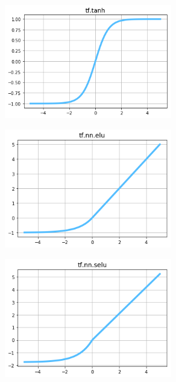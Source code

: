 \begin{figure}
\centering
\includegraphics[width=0.65\textwidth]{./sync_imgs/act/smooth/tangent.png}
\label{fig:act_smooth_tangent}
\end{figure}

\begin{figure}
\centering
\includegraphics[width=0.65\textwidth]{./sync_imgs/act/smooth/elu.png}
\label{fig:act_smooth_elu}
\end{figure}

\begin{figure}
\centering
\includegraphics[width=0.65\textwidth]{./sync_imgs/act/smooth/selu.png}
\label{fig:act_smooth_selu}
\end{figure}

